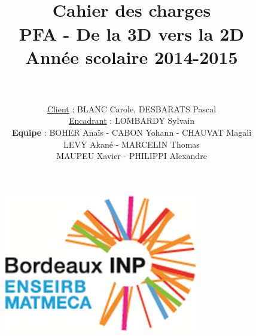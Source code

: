 \documentclass[paper=a4, fontsize=11pt]{article}
\title{
		\usefont{OT1}{bch}{b}{n}
		\horrule{1.5pt} \\[0.5cm]	
		\Huge \textbf{Cahier des charges} \\ [10pt]
		\Huge PFA - De la 3D vers la 2D \\ [15pt]
		\LARGE Année scolaire 2014-2015 \\ 
		\horrule{1.5pt} \\[0.5cm]
}
\author{
		\huge \underline{Client} : \LARGE BLANC Carole, DESBARATS Pascal\\ [10pt] 
		\huge \underline{Encadrant} : \LARGE LOMBARDY Sylvain\\[20pt]
				\normalfont 							
        \huge \textbf{Equipe} : \Large BOHER Anaïs - CABON Yohann - CHAUVAT Magali \\[5pt]
        \Large LEVY Akané - MARCELIN Thomas \\[5pt]
        \Large MAUPEU Xavier - PHILIPPI Alexandre \\[10pt]		\normalsize
}
\date{}
\numberwithin{equation}{section}		%
\numberwithin{figure}{section}			%
\numberwithin{table}{section}				%
\begin{document}
\maketitle

\begin{figure}[b]
\centering\includegraphics{logo.png}
\end{figure}

\newpage

\tableofcontents

\newpage
\end{document}

